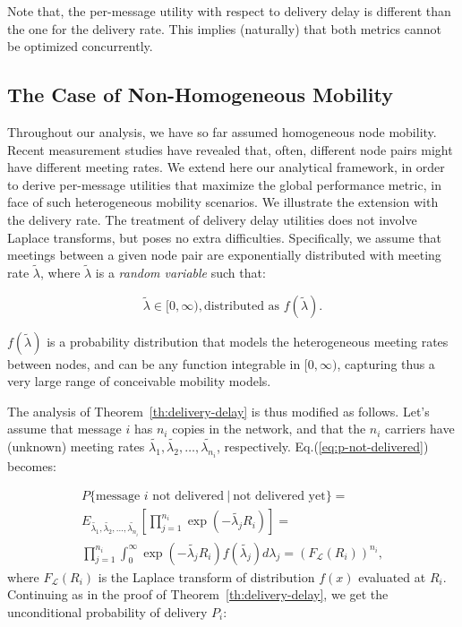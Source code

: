 Note that, the per-message utility with respect to delivery delay is different than the one for the delivery rate. This implies (naturally) that both metrics cannot be optimized concurrently.

\subsection{The Case of Non-Homogeneous Mobility}
\label{section:heterogeneous-mobility}

Throughout our analysis, we have so far assumed homogeneous node mobility. Recent measurement studies have revealed that, often, different node pairs might have different meeting rates. We extend here our analytical framework, in order to derive per-message utilities that maximize the global performance metric, in face of such heterogeneous mobility scenarios. We illustrate the extension with the delivery rate. The treatment of delivery delay utilities does not involve Laplace transforms, but poses no extra difficulties. Specifically, we assume that meetings between a given node pair are exponentially distributed with meeting rate $\tilde{\lambda}$, where $\tilde{\lambda}$ is a \emph{random variable} such that:

\begin{equation*}
\tilde{\lambda} \in [0,\infty), \mbox{distributed as } f(\tilde{\lambda}).
\end{equation*}

$f(\tilde{\lambda})$ is a probability distribution that models the heterogeneous meeting rates between nodes, and can be any function integrable in $[0,\infty)$, capturing thus a very large range of conceivable mobility models.

The analysis of Theorem~\ref{th:delivery-delay} is thus modified as follows. Let's assume that message $i$ has $n_{i}$ copies in the network, and that the $n_{i}$ carriers have (unknown) meeting rates $\tilde{\lambda_{1}},\tilde{\lambda_{2}},\dots,\tilde{\lambda_{n_{i}}}$, respectively. Eq.(\ref{eq:p-not-delivered}) becomes:

\begin{eqnarray}
P\{\mbox{message\ $i$ not\ delivered}\ |\ \mbox{not\ delivered\ yet}  \}= \nonumber \\
E_{\tilde{\lambda_{1}},\tilde{\lambda_{2}},\dots,\tilde{\lambda_{n_{i}}}} [ \prod_{j=1}^{n_i}\exp(-\tilde{\lambda_{j}} R_i ) ] = \\
\prod_{j=1}^{n_i} \int_{0}^{\infty} \exp(-\tilde{\lambda_{j}} R_i ) f(\tilde{\lambda_{j}}) d\lambda_{j}  = (F_{\mathcal{L}}(R_{i}))^{n_{i}}, \label{eq:conditional-delivery}
\end{eqnarray}
where $F_{\mathcal{L}}(R_{i})$ is the Laplace transform of distribution $f(x)$ evaluated at $R_{i}$. Continuing as in the proof of Theorem~\ref{th:delivery-delay}, we get the unconditional probability of delivery $P_{i}$:

